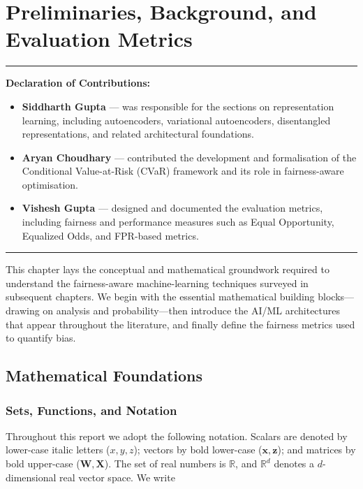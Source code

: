 \chapter{Preliminaries, Background, and Evaluation Metrics}
\label{ch:background}



\vspace{0.5em}
\noindent\rule{\textwidth}{0.4pt}
\textbf{Declaration of Contributions:} 
    \begin{itemize}[leftmargin=*,noitemsep]
    \item \textbf{Siddharth Gupta} — was responsible for the sections on representation learning, including autoencoders, variational autoencoders, disentangled representations, and related architectural foundations.
    \item \textbf{Aryan Choudhary} — contributed the development and formalisation of the Conditional Value-at-Risk (CVaR) framework and its role in fairness-aware optimisation. 
    \item \textbf{Vishesh Gupta} — designed and documented the evaluation metrics, including fairness and performance measures such as Equal Opportunity, Equalized Odds, and FPR-based metrics.
    \end{itemize}
\noindent\rule{\textwidth}{0.4pt}
\vspace{1em}

This chapter lays the conceptual and mathematical groundwork required
to understand the fairness-aware machine-learning techniques surveyed
in subsequent chapters.  We begin with the essential mathematical
building blocks—drawing on analysis and probability—then introduce the
AI/ML architectures that appear throughout the literature, and finally
define the fairness metrics used to quantify bias.

\section{Mathematical Foundations}
\label{sec:math_foundations}

\subsection{Sets, Functions, and Notation}
\label{subsec:notation}

Throughout this report we adopt the following notation.
Scalars are denoted by lower-case italic letters ($x, y, z$);
vectors by bold lower-case ($\mathbf{x}, \mathbf{z}$); and
matrices by bold upper-case ($\mathbf{W}, \mathbf{X}$).
The set of real numbers is $\mathbb{R}$, and $\mathbb{R}^d$ denotes
a $d$-dimensional real vector space.  We write

